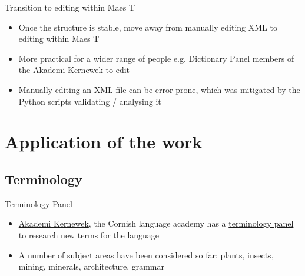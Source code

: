 \documentclass[handout]{beamer}
\begin{document}
\begin{frame}{Transition to editing within Maes T}
\begin{itemize}
\item<1-> Once the structure is stable, move away from manually editing XML to editing within Maes T
\item<2-> More practical for a wider range of people e.g. Dictionary Panel members of the Akademi Kernewek to edit
\item<3-> Manually editing an XML file can be error prone, which was mitigated by the
Python scripts validating / analysing it
\end{itemize}
\end{frame}
\section{Application of the work}
\subsection{Terminology}
\begin{frame}{Terminology Panel}
\begin{itemize}
\item<1-> \href{http://www.akademikernewek.org.uk/}{Akademi Kernewek}, the Cornish language academy has a \href{https://akademikernewek.weebly.com/terminology.html}{terminology panel} to research new terms for the language
\item<2-> A number of subject areas have been considered so far: plants, insects, mining, minerals, architecture, grammar
\end{itemize}
\end{frame}
\end{document}
